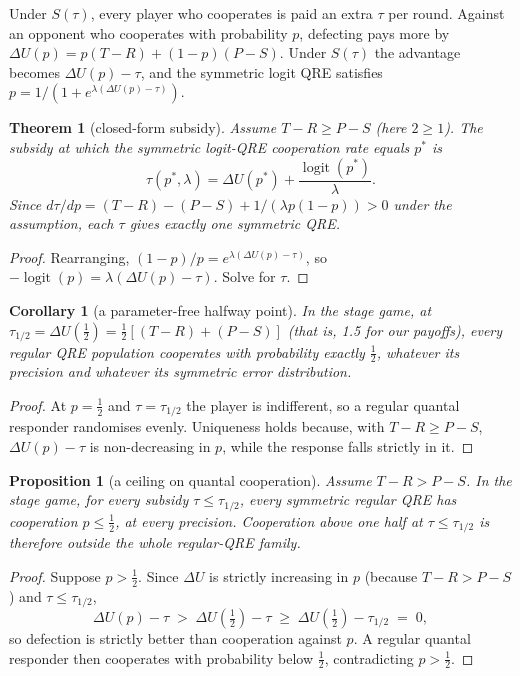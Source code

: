\documentclass[10pt]{article}
\newtheorem{theorem}{Theorem}
\newtheorem{proposition}{Proposition}
\newtheorem{corollary}{Corollary}
\theoremstyle{definition}
\theoremstyle{remark}
\newcommand{\lam}{\lambda}
\DeclareMathOperator{\logit}{logit}
\begin{document}
Under $S(\tau)$, every player who cooperates is paid an extra $\tau$ per round. Against an
opponent who cooperates with probability $p$, defecting pays more by
$\Delta U(p)=p(T-R)+(1-p)(P-S)$. Under $S(\tau)$ the advantage becomes $\Delta U(p)-\tau$, and the
symmetric logit QRE satisfies $p = 1/(1+e^{\lam(\Delta U(p)-\tau)})$.

\begin{theorem}[closed-form subsidy]\label{thm:subsidy}
Assume $T-R\ge P-S$ (here $2\ge1$). The subsidy at which the symmetric logit-QRE cooperation
rate equals $p^*$ is
\[
\tau(p^*,\lam)=\Delta U(p^*)+\frac{\logit(p^*)}{\lam}.
\]
Since $d\tau/dp=(T-R)-(P-S)+1/(\lam p(1-p))>0$ under the assumption, each $\tau$ gives exactly one
symmetric QRE.
\end{theorem}
\begin{proof}
Rearranging, $(1-p)/p=e^{\lam(\Delta U(p)-\tau)}$, so $-\logit(p)=\lam(\Delta U(p)-\tau)$. Solve
for $\tau$.
\end{proof}

\begin{corollary}[a parameter-free halfway point]\label{cor:half}
In the stage game, at $\tau_{1/2}=\Delta U(\tfrac12)=\tfrac12[(T-R)+(P-S)]$ (that is, 1.5 for our
payoffs), every regular QRE population cooperates with probability exactly $\tfrac12$, whatever
its precision and whatever its symmetric error distribution.
\end{corollary}
\begin{proof}
At $p=\tfrac12$ and $\tau=\tau_{1/2}$ the player is indifferent, so a regular quantal responder
randomises evenly. Uniqueness holds because, with $T-R\ge P-S$, $\Delta U(p)-\tau$ is
non-decreasing in $p$, while the response falls strictly in it.
\end{proof}

\begin{proposition}[a ceiling on quantal cooperation]\label{prop:ceiling}
Assume $T-R>P-S$. In the stage game, for every subsidy $\tau\le\tau_{1/2}$, every symmetric
regular QRE has
cooperation $p\le\tfrac12$, at every precision. Cooperation above one half at
$\tau\le\tau_{1/2}$ is therefore outside the whole regular-QRE family.
\end{proposition}
\begin{proof}
Suppose $p>\tfrac12$. Since $\Delta U$ is strictly increasing in $p$ (because $T-R>P-S$) and
$\tau\le\tau_{1/2}$,
\[
\Delta U(p)-\tau\;>\;\Delta U(\tfrac12)-\tau\;\ge\;\Delta U(\tfrac12)-\tau_{1/2}\;=\;0,
\]
so defection is strictly better than cooperation against $p$. A regular quantal responder then cooperates with probability below
$\tfrac12$, contradicting $p>\tfrac12$.
\end{proof}
\end{document}
